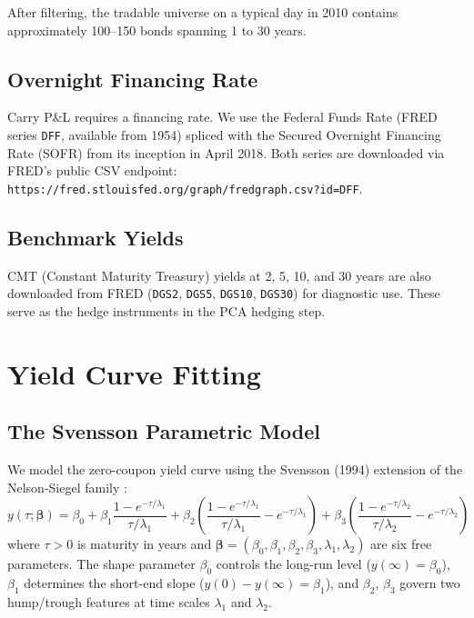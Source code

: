 \documentclass[11pt]{article}
\begin{document}
After filtering, the tradable universe on a typical day in 2010 contains
approximately 100--150 bonds spanning 1 to 30 years.

\subsection{Overnight Financing Rate}

Carry P\&L requires a financing rate. We use the Federal Funds Rate (FRED
series \texttt{DFF}, available from 1954) spliced with the Secured Overnight
Financing Rate (SOFR) from its inception in April 2018. Both series are
downloaded via FRED's public CSV endpoint:
\texttt{https://fred.stlouisfed.org/graph/fredgraph.csv?id=DFF}.

\subsection{Benchmark Yields}

CMT (Constant Maturity Treasury) yields at 2, 5, 10, and 30 years are also
downloaded from FRED (\texttt{DGS2}, \texttt{DGS5}, \texttt{DGS10},
\texttt{DGS30}) for diagnostic use. These serve as the hedge instruments in
the PCA hedging step.

\section{Yield Curve Fitting}

\subsection{The Svensson Parametric Model}

We model the zero-coupon yield curve using the Svensson (1994) extension of
the Nelson-Siegel family \cite{svensson1994}:
\begin{equation}
  y(\tau;\boldsymbol{\beta}) = \beta_0
    + \beta_1 \frac{1-e^{-\tau/\lambda_1}}{\tau/\lambda_1}
    + \beta_2 \!\left(\frac{1-e^{-\tau/\lambda_1}}{\tau/\lambda_1} -
      e^{-\tau/\lambda_1}\right)
    + \beta_3 \!\left(\frac{1-e^{-\tau/\lambda_2}}{\tau/\lambda_2} -
      e^{-\tau/\lambda_2}\right)
\end{equation}
where $\tau > 0$ is maturity in years and
$\boldsymbol{\beta} = (\beta_0, \beta_1, \beta_2, \beta_3, \lambda_1,
\lambda_2)$ are six free parameters. The shape parameter $\beta_0$ controls
the long-run level ($y(\infty) = \beta_0$), $\beta_1$ determines the short-end
slope ($y(0) - y(\infty) = \beta_1$), and $\beta_2$, $\beta_3$ govern two
hump/trough features at time scales $\lambda_1$ and $\lambda_2$.
\end{document}
